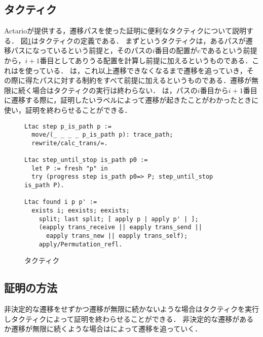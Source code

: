 \subsection{タクティク}

Actarioが提供する，遷移パスを使った証明に便利なタクティクについて説明する．
図\ref{code:proof:tactics}はタクティクの定義である．
まずというタクティクは，あるパスが遷移パスになっているという前提と，そのパスの$i$番目の配置が$c$であるという前提から，$i + 1$番目としてありうる配置を計算し前提に加えるというものである．これはを使っている．
は，これ以上遷移できなくなるまで遷移を追っていき，その際に得たパスに対する制約をすべて前提に加えるというものである．遷移が無限に続く場合はタクティクの実行は終わらない．
は，パスの$i$番目から$i + 1$番目に遷移する際に，証明したいラベルによって遷移が起きたことがわかったときに使い，証明を終わらせることができる．

\begin{figure}
\begin{lstlisting}
Ltac step p_is_path p :=
  move/(_ _ _ _ p_is_path p): trace_path;
  rewrite/calc_trans/=.

Ltac step_until_stop is_path p0 :=
  let P := fresh "p" in
  try (progress step is_path p0=> P; step_until_stop is_path P).

Ltac found i p p' :=
  exists i; eexists; eexists;
    split; last split; [ apply p | apply p' | ];
    (eapply trans_receive || eapply trans_send ||
      eapply trans_new || eapply trans_self);
    apply/Permutation_refl.
\end{lstlisting}
\label{code:proof:tactics}
\caption{タクティク}
\end{figure}

\subsection{証明の方法}

非決定的な遷移をせずかつ遷移が無限に続かないような場合はタクティクを実行しタクティクによって証明を終わらせることができる．
非決定的な遷移があるか遷移が無限に続くような場合はによって遷移を追っていく．
